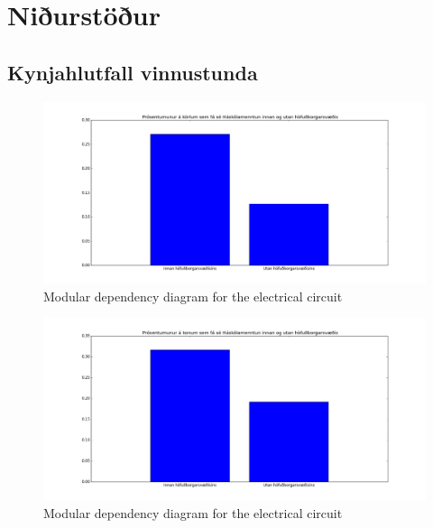 \documentclass[12pt, svn, draft]{rureport}
\begin{document}



\section{Niðurstöður}\label{nidurstodur}
\subsection{Kynjahlutfall vinnustunda}

\begin{figure}
	\centering 
	\includegraphics[scale=0.7]{../graphics/Haskolamentun_karlar_innan_utan_hs.png}
	\caption{Modular dependency diagram for the electrical circuit \label{fig:menntukarla}}
\end{figure}

\begin{figure}
	\centering 
	\includegraphics[scale=0.7]{../graphics/Haskolamentun_konur_innan_utan_hs.png}
	\caption{Modular dependency diagram for the electrical circuit \label{fig:menntunkonur}}
\end{figure}
\end{document}
